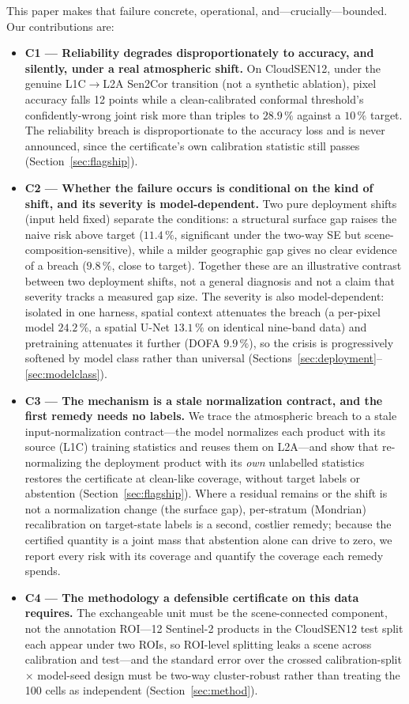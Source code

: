 \documentclass[preprint,3p,times]{elsarticle}
\begin{document}
This paper makes that failure concrete, operational, and---crucially---bounded. Our contributions are:
\begin{itemize}
\item \textbf{C1 --- Reliability degrades disproportionately to accuracy, and silently, under a real atmospheric shift.} On CloudSEN12, under the genuine L1C$\to$L2A Sen2Cor transition (not a synthetic ablation), pixel accuracy falls 12 points while a clean-calibrated conformal threshold's confidently-wrong joint risk more than triples to $28.9\,\%$ against a $10\,\%$ target. The reliability breach is disproportionate to the accuracy loss and is never announced, since the certificate's own calibration statistic still passes (Section~\ref{sec:flagship}).
\item \textbf{C2 --- Whether the failure occurs is conditional on the kind of shift, and its severity is model-dependent.} Two pure deployment shifts (input held fixed) separate the conditions: a structural surface gap raises the naive risk above target ($11.4\,\%$, significant under the two-way SE but scene-composition-sensitive), while a milder geographic gap gives no clear evidence of a breach ($9.8\,\%$, close to target). Together these are an illustrative contrast between two deployment shifts, not a general diagnosis and not a claim that severity tracks a measured gap size. The severity is also model-dependent: isolated in one harness, spatial context attenuates the breach (a per-pixel model $24.2\,\%$, a spatial U-Net $13.1\,\%$ on identical nine-band data) and pretraining attenuates it further (DOFA $9.9\,\%$), so the crisis is progressively softened by model class rather than universal (Sections~\ref{sec:deployment}--\ref{sec:modelclass}).
\item \textbf{C3 --- The mechanism is a stale normalization contract, and the first remedy needs no labels.} We trace the atmospheric breach to a stale input-normalization contract---the model normalizes each product with its source (L1C) training statistics and reuses them on L2A---and show that re-normalizing the deployment product with its \emph{own} unlabelled statistics restores the certificate at clean-like coverage, without target labels or abstention (Section~\ref{sec:flagship}). Where a residual remains or the shift is not a normalization change (the surface gap), per-stratum (Mondrian) recalibration on target-state labels is a second, costlier remedy; because the certified quantity is a joint mass that abstention alone can drive to zero, we report every risk with its coverage and quantify the coverage each remedy spends.
\item \textbf{C4 --- The methodology a defensible certificate on this data requires.} The exchangeable unit must be the scene-connected component, not the annotation ROI---12 Sentinel-2 products in the CloudSEN12 test split each appear under two ROIs, so ROI-level splitting leaks a scene across calibration and test---and the standard error over the crossed calibration-split $\times$ model-seed design must be two-way cluster-robust rather than treating the 100 cells as independent (Section~\ref{sec:method}).
\end{itemize}
\end{document}
